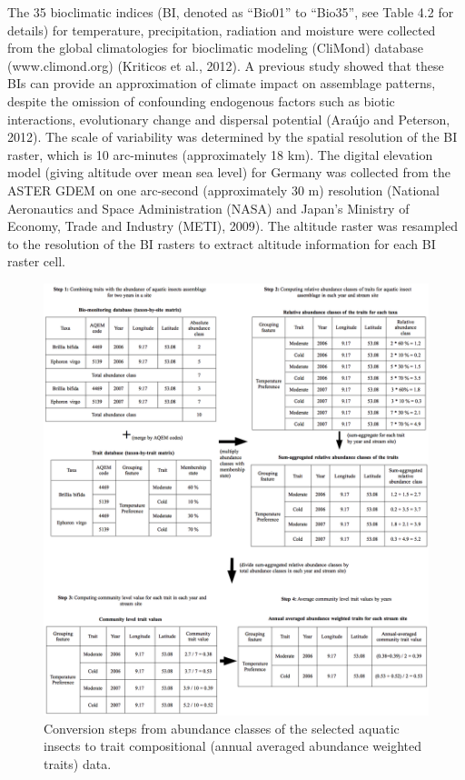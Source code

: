 The 35 bioclimatic indices (BI, denoted as “Bio01” to “Bio35”, see Table 4.2 for details) for temperature, precipitation, radiation and moisture were collected from the global climatologies for bioclimatic modeling (CliMond) database (www.climond.org) (Kriticos et al., 2012). A previous study showed that these BIs can provide an approximation of climate impact on assemblage patterns, despite the omission of confounding endogenous factors such as biotic interactions, evolutionary change and dispersal potential (Araújo and Peterson, 2012). The scale of variability was determined by the spatial resolution of the BI raster, which is 10 arc-minutes (approximately 18 km). The digital elevation model (giving altitude over mean sea level) for Germany was collected from the ASTER GDEM on one arc-second (approximately 30 m) resolution (National Aeronautics and Space Administration (NASA) and Japan’s Ministry of Economy, Trade and Industry (METI), 2009). The altitude raster was resampled to the resolution of the BI rasters to extract altitude information for each BI raster cell.

\begin{figure}[h!]
  \centering
  \includegraphics[width=0.8\linewidth]{Figures/Fig_4_2.png}
  \caption{Conversion steps from abundance classes of the selected aquatic insects to trait compositional (annual averaged abundance weighted traits) data.}
  \label{Fig_4_2}
\end{figure}

